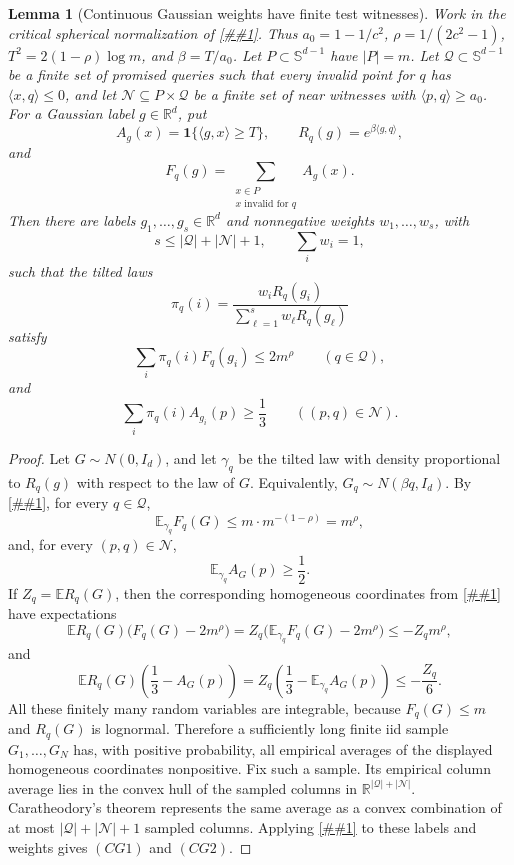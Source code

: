 \documentclass[10pt]{article}
\newcommand{\cref}[1]{\ref{##1}}
\newtheorem{lemma}[theorem]{Lemma}
\theoremstyle{definition}
\newcommand{\R}{\mathbb{R}}
\newcommand{\E}{\mathbb{E}}
\newcommand{\ip}[2]{\langle #1,#2\rangle}
\begin{document}
\begin{lemma}[Continuous Gaussian weights have finite test witnesses]
   \label{lem:continuous-gaussian-finite-witness}
   Work in the critical spherical normalization of
   \cref{lem:critical-tilted-gaussian-sampled-spectrum}.  Thus
   \(a_0=1-1/c^2\), \(\rho=1/(2c^2-1)\),
   \(T^2=2(1-\rho)\log m\), and \(\beta=T/a_0\).  Let
   \(P\subset\mathbb S^{d-1}\) have \(|P|=m\).  Let
   \(\mathcal Q\subset\mathbb S^{d-1}\) be a finite set of promised queries
   such that every invalid point for \(q\) has \(\ip{x}{q}\le0\), and let
   \(\mathcal N\subseteq P\times\mathcal Q\) be a finite set of near witnesses
   with \(\ip{p}{q}\ge a_0\).  For a Gaussian label \(g\in\R^d\), put
   \[
      A_g(x)=\mathbf 1\{\ip{g}{x}\ge T\},
      \qquad
      R_q(g)=e^{\beta\ip{g}{q}},
   \]
   and
   \[
      F_q(g)=
      \sum_{\substack{x\in P\\ x\text{ invalid for }q}}A_g(x).
   \]
   Then there are labels \(g_1,\ldots,g_s\in\R^d\) and nonnegative weights
   \(w_1,\ldots,w_s\), with
   \[
      s\le |\mathcal Q|+|\mathcal N|+1,
      \qquad
      \sum_iw_i=1,
   \]
   such that the tilted laws
   \[
      \pi_q(i)=
      \frac{w_iR_q(g_i)}{\sum_{\ell=1}^sw_\ell R_q(g_\ell)}
   \]
   satisfy
   \[
      \sum_i\pi_q(i)F_q(g_i)\le 2m^\rho
      \qquad(q\in\mathcal Q),
      \tag{CG1}
   \]
   and
   \[
      \sum_i\pi_q(i)A_{g_i}(p)\ge\frac13
      \qquad((p,q)\in\mathcal N).
      \tag{CG2}
   \]
\end{lemma}

\begin{proof}
   Let \(G\sim N(0,I_d)\), and let \(\gamma_q\) be the tilted law with density
   proportional to \(R_q(g)\) with respect to the law of \(G\).  Equivalently,
   \(G_q\sim N(\beta q,I_d)\).  By
   \cref{lem:critical-tilted-gaussian-sampled-spectrum}, for every
   \(q\in\mathcal Q\),
   \[
      \E_{\gamma_q}F_q(G)
      \le
      m\cdot m^{-(1-\rho)}
      =
      m^\rho,
   \]
   and, for every \((p,q)\in\mathcal N\),
   \[
      \E_{\gamma_q}A_G(p)\ge\frac12 .
   \]
   If \(Z_q=\E R_q(G)\), then the corresponding homogeneous coordinates from
   \cref{lem:tilted-weight-linear-feasibility} have expectations
   \[
      \E R_q(G)\bigl(F_q(G)-2m^\rho\bigr)
      =
      Z_q\bigl(\E_{\gamma_q}F_q(G)-2m^\rho\bigr)
      \le
      -Z_qm^\rho,
   \]
   and
   \[
      \E R_q(G)\left(\frac13-A_G(p)\right)
      =
      Z_q\left(\frac13-\E_{\gamma_q}A_G(p)\right)
      \le
      -\frac{Z_q}{6}.
   \]
   All these finitely many random variables are integrable, because
   \(F_q(G)\le m\) and \(R_q(G)\) is lognormal.  Therefore a sufficiently long
   finite iid sample \(G_1,\ldots,G_N\) has, with positive probability, all
   empirical averages of the displayed homogeneous coordinates nonpositive.
   Fix such a sample.  Its empirical column average lies in the convex hull of
   the sampled columns in
   \(\R^{|\mathcal Q|+|\mathcal N|}\).  Caratheodory's theorem represents the
   same average as a convex combination of at most
   \(|\mathcal Q|+|\mathcal N|+1\) sampled columns.  Applying
   \cref{lem:tilted-weight-linear-feasibility} to these labels and weights
   gives \((CG1)\) and \((CG2)\).
\end{proof}
\end{document}
